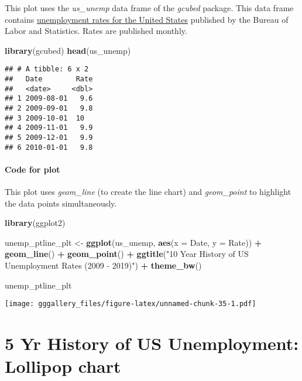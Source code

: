 \documentclass[]{book}
\newenvironment{Shaded}{\begin{snugshade}}{\end{snugshade}}
\newcommand{\DataTypeTok}[1]{\textcolor[rgb]{0.13,0.29,0.53}{#1}}
\newcommand{\KeywordTok}[1]{\textcolor[rgb]{0.13,0.29,0.53}{\textbf{#1}}}
\newcommand{\NormalTok}[1]{#1}
\newcommand{\OperatorTok}[1]{\textcolor[rgb]{0.81,0.36,0.00}{\textbf{#1}}}
\newcommand{\StringTok}[1]{\textcolor[rgb]{0.31,0.60,0.02}{#1}}
\begin{document}
This plot uses the \emph{us\_unemp} data frame of the \emph{gcubed} package. This data frame contains \href{https://data.bls.gov/timeseries/LNS14000000}{unemployment rates for the United States} published by the Bureau of Labor and Statistics. Rates are published monthly.

\begin{Shaded}
\begin{Highlighting}[]
\KeywordTok{library}\NormalTok{(gcubed)}
\KeywordTok{head}\NormalTok{(us_unemp)}
\end{Highlighting}
\end{Shaded}

\begin{verbatim}
## # A tibble: 6 x 2
##   Date        Rate
##   <date>     <dbl>
## 1 2009-08-01   9.6
## 2 2009-09-01   9.8
## 3 2009-10-01  10  
## 4 2009-11-01   9.9
## 5 2009-12-01   9.9
## 6 2010-01-01   9.8
\end{verbatim}

\hypertarget{unemppcode}{%
\subsubsection*{Code for plot}\label{unemppcode}}

This plot uses \emph{geom\_line} (to create the line chart) and \emph{geom\_point} to highlight the data
points simultaneously.

\begin{Shaded}
\begin{Highlighting}[]
\KeywordTok{library}\NormalTok{(ggplot2)}

\NormalTok{unemp_ptline_plt <-}\StringTok{ }\KeywordTok{ggplot}\NormalTok{(us_unemp, }\KeywordTok{aes}\NormalTok{(}\DataTypeTok{x =}\NormalTok{ Date, }\DataTypeTok{y =}\NormalTok{ Rate)) }\OperatorTok{+}\StringTok{ }
\StringTok{  }\KeywordTok{geom_line}\NormalTok{() }\OperatorTok{+}\StringTok{ }\KeywordTok{geom_point}\NormalTok{() }\OperatorTok{+}
\StringTok{  }\KeywordTok{ggtitle}\NormalTok{(}\StringTok{"10 Year History of US Unemployment Rates (2009 - 2019)"}\NormalTok{)  }\OperatorTok{+}
\StringTok{  }\KeywordTok{theme_bw}\NormalTok{()}

\NormalTok{unemp_ptline_plt}
\end{Highlighting}
\end{Shaded}

\texttt{[image: gggallery\_files/figure-latex/unnamed-chunk-35-1.pdf]}

\hypertarget{unemppp}{%
\chapter*{5 Yr History of US Unemployment: Lollipop chart}\label{unemppp}}
\end{document}
